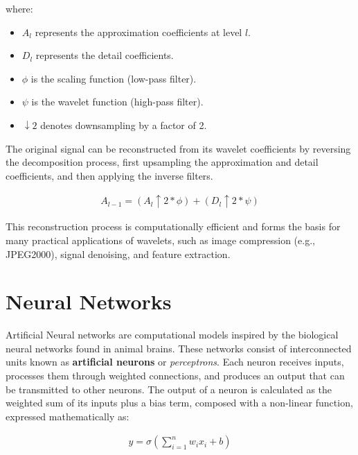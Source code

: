 where:
\begin{itemize}
  \item \( A_l \) represents the approximation coefficients at level \( l \).
  \item \( D_l \) represents the detail coefficients.
  \item \( \phi \) is the scaling function (low-pass filter).
  \item \( \psi \) is the wavelet function (high-pass filter).
  \item \( \downarrow 2 \) denotes downsampling by a factor of 2.
\end{itemize}


The original signal can be reconstructed from its wavelet coefficients by reversing the decomposition process, first upsampling the approximation and detail coefficients, and then applying the inverse filters.

\begin{align}
  A_{l-1} = (A_l \uparrow 2 * \phi) + (D_l \uparrow 2 * \psi)  
\end{align}

This reconstruction process is computationally efficient and forms the basis for many practical applications of wavelets, such as image compression (e.g., JPEG2000), signal denoising, and feature extraction.


\section{Neural Networks}

Artificial Neural networks are computational models inspired by the biological neural networks found in animal brains. These networks consist of interconnected units known as \textbf{artificial neurons} or \textit{perceptrons}. Each neuron receives inputs, processes them through weighted connections, and produces an output that can be transmitted to other neurons. The output of a neuron is calculated as the weighted sum of its inputs plus a bias term, composed with a non-linear function, expressed mathematically as:

\begin{align}
  y = \sigma\left(\sum_{i=1}^{n} w_i x_i + b\right)  
\end{align}

